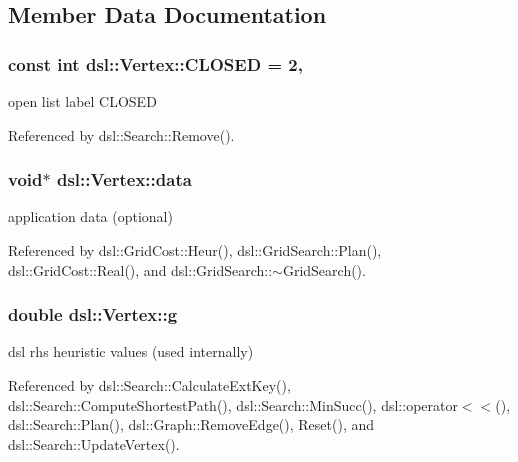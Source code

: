 \subsection{Member Data Documentation}
\subsubsection[{C\-L\-O\-S\-E\-D}]{\setlength{\rightskip}{0pt plus 5cm}const int dsl\-::\-Vertex\-::\-C\-L\-O\-S\-E\-D = 2\hspace{0.3cm}{\ttfamily [static]}, {\ttfamily [protected]}}\label{classdsl_1_1Vertex_a6f1927e13f5c9c52fe241d379790ecc4}


open list label C\-L\-O\-S\-E\-D 



Referenced by dsl\-::\-Search\-::\-Remove().

\subsubsection[{data}]{\setlength{\rightskip}{0pt plus 5cm}void$\ast$ dsl\-::\-Vertex\-::data}\label{classdsl_1_1Vertex_a2c6f027591db54c5fbf5e50e27def3a0}


application data (optional) 



Referenced by dsl\-::\-Grid\-Cost\-::\-Heur(), dsl\-::\-Grid\-Search\-::\-Plan(), dsl\-::\-Grid\-Cost\-::\-Real(), and dsl\-::\-Grid\-Search\-::$\sim$\-Grid\-Search().

\subsubsection[{g}]{\setlength{\rightskip}{0pt plus 5cm}double dsl\-::\-Vertex\-::g}\label{classdsl_1_1Vertex_a1792e5abf07174d4e24e5dd3d3fb6e12}


dsl rhs heuristic values (used internally) 



Referenced by dsl\-::\-Search\-::\-Calculate\-Ext\-Key(), dsl\-::\-Search\-::\-Compute\-Shortest\-Path(), dsl\-::\-Search\-::\-Min\-Succ(), dsl\-::operator$<$$<$(), dsl\-::\-Search\-::\-Plan(), dsl\-::\-Graph\-::\-Remove\-Edge(), Reset(), and dsl\-::\-Search\-::\-Update\-Vertex().

